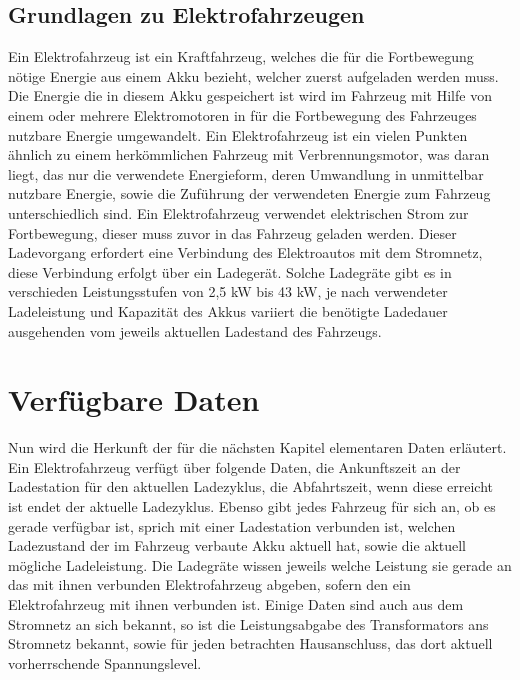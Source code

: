 \subsection{Grundlagen zu Elektrofahrzeugen}
Ein Elektrofahrzeug ist ein Kraftfahrzeug, welches die für die Fortbewegung nötige Energie aus einem Akku bezieht, welcher zuerst aufgeladen werden muss. Die Energie die in diesem Akku gespeichert ist wird im Fahrzeug mit Hilfe von einem oder mehrere Elektromotoren in für die Fortbewegung des Fahrzeuges nutzbare Energie umgewandelt. Ein Elektrofahrzeug ist ein vielen Punkten ähnlich zu einem herkömmlichen Fahrzeug mit Verbrennungsmotor, was daran liegt, das nur die verwendete Energieform, deren Umwandlung in unmittelbar nutzbare Energie, sowie die Zuführung der verwendeten Energie zum Fahrzeug unterschiedlich sind. Ein Elektrofahrzeug verwendet elektrischen Strom zur Fortbewegung, dieser muss zuvor in das Fahrzeug geladen werden. Dieser Ladevorgang erfordert eine Verbindung des Elektroautos mit dem Stromnetz, diese Verbindung erfolgt über ein Ladegerät. Solche Ladegräte gibt es in verschieden Leistungsstufen von 2,5 kW bis 43 kW, je nach verwendeter Ladeleistung und Kapazität des Akkus variiert die benötigte Ladedauer ausgehenden vom jeweils aktuellen Ladestand des Fahrzeugs.

\section{Verfügbare Daten}
\label{cap:background_sec:setting}
Nun wird die Herkunft der für die nächsten Kapitel elementaren Daten erläutert. Ein Elektrofahrzeug verfügt über folgende Daten, die Ankunftszeit an der Ladestation für den aktuellen Ladezyklus, die Abfahrtszeit, wenn diese erreicht ist endet der aktuelle Ladezyklus. Ebenso gibt jedes Fahrzeug für sich an, ob es gerade verfügbar ist, sprich mit einer Ladestation verbunden ist, welchen Ladezustand der im Fahrzeug verbaute Akku aktuell hat, sowie die aktuell mögliche Ladeleistung. Die Ladegräte wissen jeweils welche Leistung sie gerade an das mit ihnen verbunden Elektrofahrzeug abgeben, sofern den ein Elektrofahrzeug mit ihnen verbunden ist. Einige Daten sind auch aus dem Stromnetz an sich bekannt, so ist die Leistungsabgabe des Transformators ans Stromnetz bekannt, sowie für jeden betrachten Hausanschluss, das dort aktuell vorherrschende Spannungslevel.

